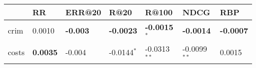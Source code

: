 \begin{tabular}{lllllll}
\toprule
{} &               RR &  ERR@20 &           R@20 &           R@100 &            NDCG &      RBP \\
\midrule
crim  &   0.0010 &  \textbf{-0.003} &        \textbf{-0.0023} &  \textbf{-0.0015$^{*}$} &         \textbf{-0.0014} &  \textbf{-0.0007} \\
costs &  \textbf{0.0035} &  -0.004 &  -0.0144$^{*}$ &  -0.0313$^{**}$ &  -0.0099$^{**}$ &   0.0015 \\
\bottomrule
\end{tabular}
